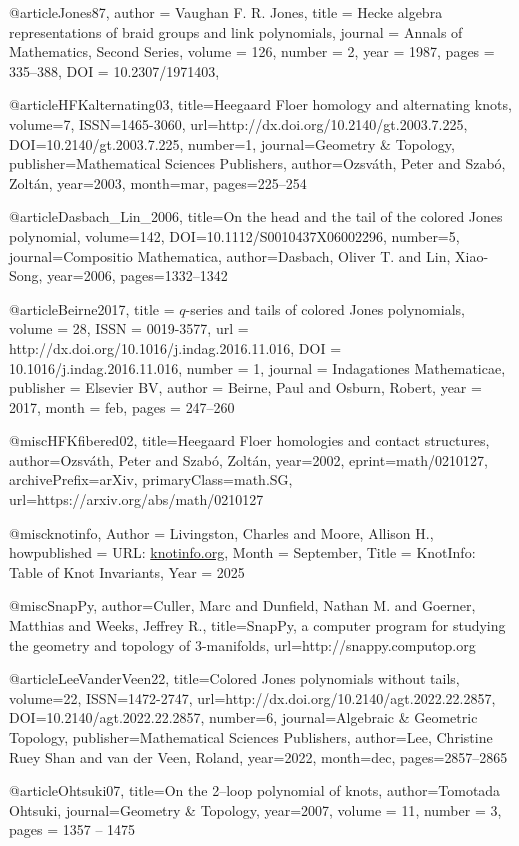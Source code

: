 @article{Jones87,
  author = {Vaughan F. R. Jones},
  title = {Hecke algebra representations of braid groups and link polynomials},
  journal = {Annals of Mathematics, Second Series},
  volume = {126},
  number = {2},
  year = {1987},
  pages = {335--388},
  DOI = {10.2307/1971403},
}

@article{HFKalternating03,
   title={Heegaard {Floer} homology and alternating knots},
   volume={7},
   ISSN={1465-3060},
   url={http://dx.doi.org/10.2140/gt.2003.7.225},
   DOI={10.2140/gt.2003.7.225},
   number={1},
   journal={Geometry \& Topology},
   publisher={Mathematical Sciences Publishers},
   author={Ozsváth, Peter and Szabó, Zoltán},
   year={2003},
   month=mar, pages={225--254} }

@article{Dasbach_Lin_2006, 
  title={On the head and the tail of the colored Jones polynomial}, 
  volume={142}, 
  DOI={10.1112/S0010437X06002296}, 
  number={5}, 
  journal={Compositio Mathematica},
  author={Dasbach, Oliver T. and Lin, Xiao-Song}, 
  year={2006},
  pages={1332--1342}
}

@article{Beirne2017,
  title = {$q$-series and tails of colored {Jones} polynomials},
  volume = {28},
  ISSN = {0019-3577},
  url = {http://dx.doi.org/10.1016/j.indag.2016.11.016},
  DOI = {10.1016/j.indag.2016.11.016},
  number = {1},
  journal = {Indagationes Mathematicae},
  publisher = {Elsevier BV},
  author = {Beirne,  Paul and Osburn,  Robert},
  year = {2017},
  month = feb,
  pages = {247--260}
}

@misc{HFKfibered02,
  title={Heegaard {Floer} homologies and contact structures}, 
  author={Ozsváth,  Peter and Szabó,  Zoltán},
  year={2002},
  eprint={math/0210127},
  archivePrefix={arXiv},
  primaryClass={math.SG},
  url={https://arxiv.org/abs/math/0210127}
}

@misc{knotinfo,
  Author = {Livingston, Charles and Moore, Allison H.},
  howpublished = {URL: \url{knotinfo.org}},
  Month = {September},
  Title = {KnotInfo: Table of Knot Invariants},
  Year = {2025}
}   

@misc{SnapPy,
  author={Culler, Marc and Dunfield, Nathan M. and Goerner,
  Matthias and Weeks, Jeffrey R.},
  title={Snap{P}y, a computer program for studying the geometry and topology of $3$-manifolds},
  url={http://snappy.computop.org} 
}

@article{LeeVanderVeen22,
  title={Colored Jones polynomials without tails},
  volume={22},
  ISSN={1472-2747},
  url={http://dx.doi.org/10.2140/agt.2022.22.2857},
  DOI={10.2140/agt.2022.22.2857},
  number={6},
  journal={Algebraic \& Geometric Topology},
  publisher={Mathematical Sciences Publishers},
  author={Lee, Christine Ruey Shan and van der Veen, Roland},
  year={2022},
  month=dec, pages={2857--2865} 
}

@article{Ohtsuki07,
  title={On the 2--loop polynomial of knots},
  author={Tomotada Ohtsuki},
  journal={Geometry \& Topology},
  year={2007},
  volume = {11},
  number = {3},
  pages = {1357 -- 1475}
}
